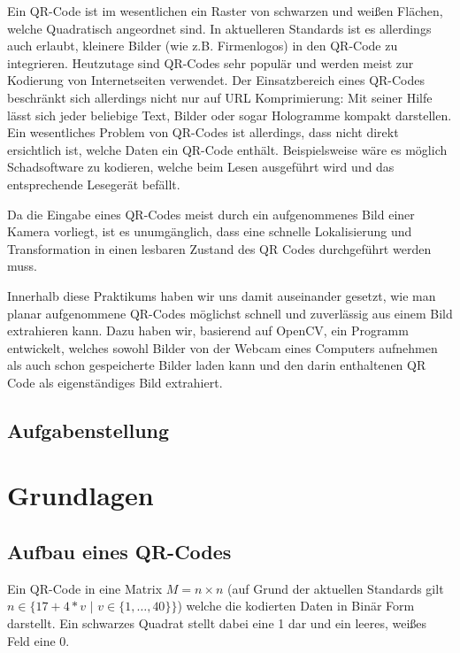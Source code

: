 \documentclass[a4paper, oneside, 12pt]{article}
\begin{document}
Ein QR-Code ist im wesentlichen ein Raster von schwarzen und weißen Flächen, welche Quadratisch angeordnet sind. In aktuelleren Standards ist es allerdings auch erlaubt, kleinere Bilder (wie z.B. Firmenlogos) in den QR-Code zu integrieren. Heutzutage sind QR-Codes sehr populär und werden meist zur Kodierung von Internetseiten verwendet. Der Einsatzbereich eines QR-Codes beschränkt sich allerdings nicht nur auf URL Komprimierung: Mit seiner Hilfe lässt sich jeder beliebige Text, Bilder oder sogar Hologramme kompakt darstellen. Ein wesentliches Problem von QR-Codes ist allerdings, dass nicht direkt ersichtlich ist, welche Daten ein QR-Code enthält. Beispielsweise wäre es möglich Schadsoftware zu kodieren, welche beim Lesen ausgeführt wird und das entsprechende Lesegerät befällt.

Da die Eingabe eines QR-Codes meist durch ein aufgenommenes Bild einer Kamera vorliegt, ist es unumgänglich, dass eine schnelle Lokalisierung und Transformation in einen lesbaren Zustand des QR Codes durchgeführt werden muss.

Innerhalb diese Praktikums haben wir uns damit auseinander gesetzt, wie man planar aufgenommene QR-Codes möglichst schnell und zuverlässig aus einem Bild extrahieren kann. Dazu haben wir, basierend auf OpenCV, ein Programm entwickelt, welches sowohl Bilder von der Webcam eines Computers aufnehmen als auch schon gespeicherte Bilder laden kann und den  darin enthaltenen QR Code als eigenständiges Bild extrahiert.

\subsection{Aufgabenstellung}
\label{ss:aufgabe}

\newpage

\section{Grundlagen}
\label{s:grundlagen}

\subsection{Aufbau eines QR-Codes}
\label{ss:aufbau}

Ein QR-Code in eine Matrix $M = n \times n$ \Big(auf Grund der aktuellen Standards gilt $n \in \big\{17+4*v \,\, | \,\, v \in  \{1,\dots, 40\}\big\}$\Big) welche die kodierten Daten in Binär Form darstellt. Ein schwarzes Quadrat stellt dabei eine 1 dar und ein leeres, weißes Feld eine 0.
\end{document}
